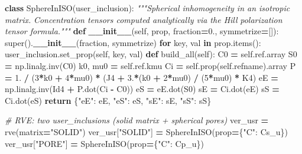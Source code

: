 \documentclass[
  a4paper,
  numbers=noendperiod,
  DIV=12]{scrreprt}
\newenvironment{Shaded}{\begin{snugshade}}{\end{snugshade}}
\newcommand{\BuiltInTok}[1]{#1}
\newcommand{\CommentTok}[1]{\textcolor[rgb]{0.56,0.35,0.01}{\textit{#1}}}
\newcommand{\ControlFlowTok}[1]{\textcolor[rgb]{0.13,0.29,0.53}{\textbf{#1}}}
\newcommand{\DecValTok}[1]{\textcolor[rgb]{0.00,0.00,0.81}{#1}}
\newcommand{\FloatTok}[1]{\textcolor[rgb]{0.00,0.00,0.81}{#1}}
\newcommand{\FunctionTok}[1]{\textcolor[rgb]{0.13,0.29,0.53}{\textbf{#1}}}
\newcommand{\KeywordTok}[1]{\textcolor[rgb]{0.13,0.29,0.53}{\textbf{#1}}}
\newcommand{\NormalTok}[1]{#1}
\newcommand{\OperatorTok}[1]{\textcolor[rgb]{0.81,0.36,0.00}{\textbf{#1}}}
\newcommand{\StringTok}[1]{\textcolor[rgb]{0.31,0.60,0.02}{#1}}
\newcommand{\VariableTok}[1]{\textcolor[rgb]{0.00,0.00,0.00}{#1}}
\begin{document}
\begin{Shaded}
\begin{Highlighting}[]
\KeywordTok{class}\NormalTok{ SphereInISO(user\_inclusion):}
    \CommentTok{"""Spherical inhomogeneity in an isotropic matrix.}
\CommentTok{    Concentration tensors computed analytically via the Hill}
\CommentTok{    polarization tensor formula."""}
    \KeywordTok{def} \FunctionTok{\_\_init\_\_}\NormalTok{(}\VariableTok{self}\NormalTok{, prop, fraction}\OperatorTok{=}\FloatTok{0.}\NormalTok{, symmetrize}\OperatorTok{=}\NormalTok{[]):}
        \BuiltInTok{super}\NormalTok{().}\FunctionTok{\_\_init\_\_}\NormalTok{(fraction, symmetrize)}
        \ControlFlowTok{for}\NormalTok{ key, val }\KeywordTok{in}\NormalTok{ prop.items():}
\NormalTok{            user\_inclusion.set\_prop(}\VariableTok{self}\NormalTok{, key, val)}
    \KeywordTok{def}\NormalTok{ build\_all(}\VariableTok{self}\NormalTok{):}
\NormalTok{        C0      }\OperatorTok{=} \VariableTok{self}\NormalTok{.ref.array}
\NormalTok{        S0      }\OperatorTok{=}\NormalTok{ np.linalg.inv(C0)}
\NormalTok{        k0, mu0 }\OperatorTok{=} \VariableTok{self}\NormalTok{.ref.kmu}
\NormalTok{        Ci }\OperatorTok{=} \VariableTok{self}\NormalTok{.prop(}\VariableTok{self}\NormalTok{.refname).array}
\NormalTok{        P  }\OperatorTok{=} \FloatTok{1.} \OperatorTok{/}\NormalTok{ (}\DecValTok{3}\OperatorTok{*}\NormalTok{k0 }\OperatorTok{+} \DecValTok{4}\OperatorTok{*}\NormalTok{mu0) }\OperatorTok{*}\NormalTok{ (J4 }\OperatorTok{+} \FloatTok{3.}\OperatorTok{*}\NormalTok{(k0 }\OperatorTok{+} \DecValTok{2}\OperatorTok{*}\NormalTok{mu0) }\OperatorTok{/}\NormalTok{ (}\DecValTok{5}\OperatorTok{*}\NormalTok{mu0) }\OperatorTok{*}\NormalTok{ K4)}
\NormalTok{        eE }\OperatorTok{=}\NormalTok{ np.linalg.inv(Id4 }\OperatorTok{+}\NormalTok{ P.dot(Ci }\OperatorTok{{-}}\NormalTok{ C0))}
\NormalTok{        eS }\OperatorTok{=}\NormalTok{ eE.dot(S0)}
\NormalTok{        sE }\OperatorTok{=}\NormalTok{ Ci.dot(eE)}
\NormalTok{        sS }\OperatorTok{=}\NormalTok{ Ci.dot(eS)}
        \ControlFlowTok{return}\NormalTok{ \{}\StringTok{"eE"}\NormalTok{: eE, }\StringTok{"eS"}\NormalTok{: eS, }\StringTok{"sE"}\NormalTok{: sE, }\StringTok{"sS"}\NormalTok{: sS\}}

\CommentTok{\# RVE: two user\_inclusions (solid matrix + spherical pores)}
\NormalTok{ver\_usr }\OperatorTok{=}\NormalTok{ rve(matrix}\OperatorTok{=}\StringTok{"SOLID"}\NormalTok{)}
\NormalTok{ver\_usr[}\StringTok{"SOLID"}\NormalTok{] }\OperatorTok{=}\NormalTok{ SphereInISO(prop}\OperatorTok{=}\NormalTok{\{}\StringTok{"C"}\NormalTok{: Cs\_u\})}
\NormalTok{ver\_usr[}\StringTok{"PORE"}\NormalTok{]  }\OperatorTok{=}\NormalTok{ SphereInISO(prop}\OperatorTok{=}\NormalTok{\{}\StringTok{"C"}\NormalTok{: Cp\_u\})}


\end{Highlighting}
\end{Shaded}
\end{document}
